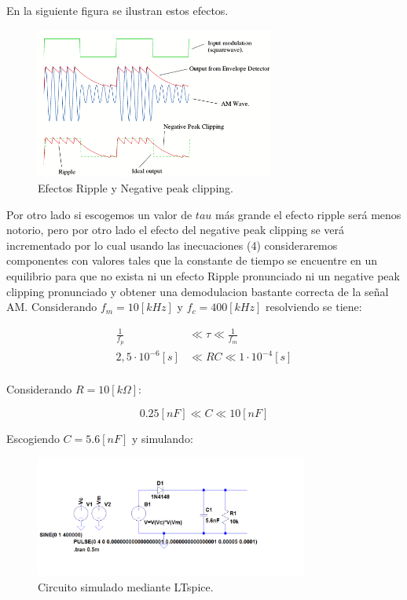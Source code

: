 \documentclass[letterpaper, titlepage]{article}
\begin{document}
\begin{enumerate}
En la siguiente figura se ilustran estos efectos.	
		
\begin{figure}[H]
  \centering
    \includegraphics[width=0.7\textwidth]{demodulacion1}
  \caption{Efectos Ripple y Negative peak clipping.}
  \label{fig:ejemplo}
\end{figure}


Por otro lado si escogemos un valor de $tau$ más grande el efecto ripple será menos notorio, pero por otro lado el efecto del negative peak clipping se verá incrementado por lo cual usando las inecuaciones (4) consideraremos componentes con valores tales que la constante de tiempo se encuentre en un equilibrio 
para que no exista ni un efecto Ripple pronunciado ni un negative peak clipping pronunciado y obtener una demodulacion bastante correcta de la señal AM.
\newpage
Considerando $ f_{m} = 10[kHz] $ y $ f_{c} = 400[kHz] $ resolviendo se tiene:

\begin{align*}
\frac{1}{f_{p}}& \ll \tau \ll  \frac{1}{f_{m}} \\
2,5\cdot10^{-6} [s] &  \ll RC \ll  1\cdot10^{-4} [s] \\
\end{align*}

Considerando $ R = 10[k \Omega] $:

\begin{equation}
0.25[nF]   \ll C \ll  10[nF]
\end{equation}

Escogiendo $ C = 5.6[nF] $ y simulando:

\begin{figure}[H]
  \centering
    \includegraphics[width=0.8\textwidth]{circuitosim}
  \caption{Circuito simulado mediante LTspice.}
  \label{fig:ejemplo}
\end{figure}


\end{enumerate}
\end{document}
